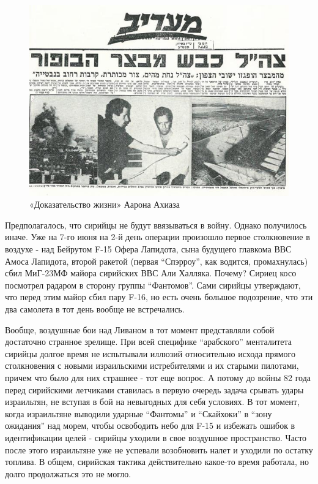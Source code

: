 \begin{figure}[h!tb] 
	\centering\includegraphics[scale=0.3]{Bekaa_2/LJY5OEnRwx8.jpg}
	\caption{«Доказательство жизни» Аарона Ахиаза}%
\end{figure}

Предполагалось, что сирийцы не будут ввязываться в войну. Однако получилось иначе. Уже на 7-го июня на 2-й день операции произошло первое столкновение в воздухе - над Бейрутом F-15 Офера Лапидота, сына будущего главкома ВВС Амоса Лапидота, второй ракетой (первая “Спэрроу”, как водится, промахнулась) сбил МиГ-23МФ майора сирийских ВВС Али Халляка. Почему? Сириец косо посмотрел радаром в сторону группы “Фантомов”. Сами сирийцы утверждают, что перед этим майор сбил пару F-16, но есть очень большое подозрение, что эти два самолета в тот день вообще не встречались.

Вообще, воздушные бои над Ливаном в тот момент представляли собой достаточно странное зрелище. При всей специфике “арабского” менталитета сирийцы долгое время не испытывали иллюзий относительно исхода прямого столкновения с новыми израильскими истребителями и их старыми пилотами, причем что было для них страшнее - тот еще вопрос. А потому до войны 82 года перед сирийскими летчиками ставилась в первую очередь задача срывать удары израильтян, не вступая в бой на невыгодных для себя условиях. В тот момент, когда израильтяне выводили ударные “Фантомы” и “Скайхоки” в “зону ожидания” над морем, чтобы освободить небо для F-15 и избежать ошибок в идентификации целей - сирийцы уходили в свое воздушное пространство. Часто после этого израильтяне уже не успевали возобновить налет и уходили по остатку топлива. В общем, сирийская тактика действительно какое-то время работала, но долго продолжаться это не могло.

